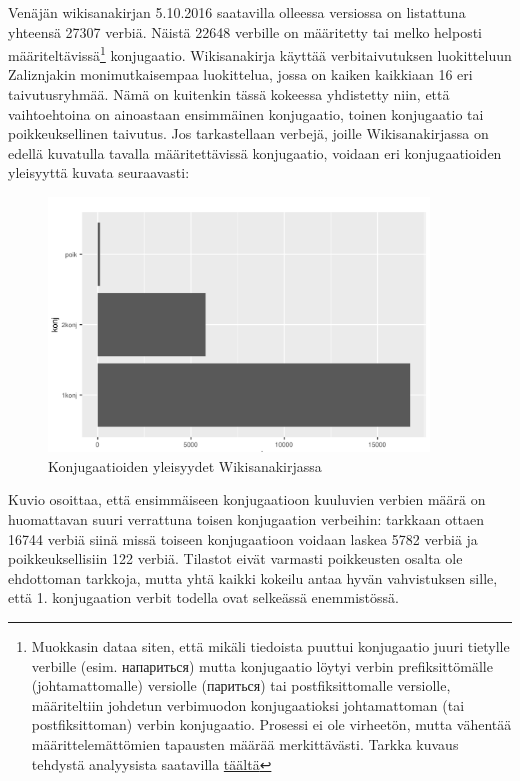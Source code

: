 \documentclass[]{scrartcl}
\begin{document}
Venäjän wikisanakirjan 5.10.2016 saatavilla olleessa versiossa on
listattuna\\
yhteensä 27307 verbiä. Näistä 22648 verbille on määritetty tai melko
helposti määriteltävissä\footnote{Muokkasin dataa siten, että mikäli
  tiedoista puuttui konjugaatio juuri tietylle verbille (esim.
  напариться) mutta konjugaatio löytyi verbin prefiksittömälle
  (johtamattomalle) versiolle (париться) tai postfiksittomalle
  versiolle, määriteltiin johdetun verbimuodon konjugaatioksi
  johtamattoman (tai postfiksittoman) verbin konjugaatio. Prosessi ei
  ole virheetön, mutta vähentää määrittelemättömien tapausten määrää
  merkittävästi. Tarkka kuvaus tehdystä analyysista saatavilla
  \href{https://github.com/hrmJ/morfologia/blob/master/wikianalysis.Rmd}{täältä}}
konjugaatio. Wikisanakirja käyttää verbitaivutuksen luokitteluun
Zaliznjakin monimutkaisempaa luokittelua, jossa on kaiken kaikkiaan 16
eri taivutusryhmää. Nämä on kuitenkin tässä kokeessa yhdistetty niin,
että vaihtoehtoina on ainoastaan ensimmäinen konjugaatio, toinen
konjugaatio tai poikkeuksellinen taivutus. Jos tarkastellaan verbejä,
joille Wikisanakirjassa on edellä kuvatulla tavalla määritettävissä
konjugaatio, voidaan eri konjugaatioiden yleisyyttä kuvata seuraavasti:

\FloatBarrier
\begin{figure}[htbp]
\centering
    \includegraphics[width=0.9\textwidth,keepaspectratio]{../figure/wikidata.pdf}
\caption{Konjugaatioiden yleisyydet Wikisanakirjassa}
\end{figure}
\FloatBarrier

Kuvio osoittaa, että ensimmäiseen konjugaatioon kuuluvien verbien määrä
on huomattavan suuri verrattuna toisen konjugaation verbeihin: tarkkaan
ottaen 16744 verbiä siinä missä toiseen konjugaatioon voidaan laskea
5782 verbiä ja poikkeuksellisiin 122 verbiä. Tilastot eivät varmasti
poikkeusten osalta ole ehdottoman tarkkoja, mutta yhtä kaikki kokeilu
antaa hyvän vahvistuksen sille, että 1. konjugaation verbit todella ovat
selkeässä enemmistössä.
\end{document}
